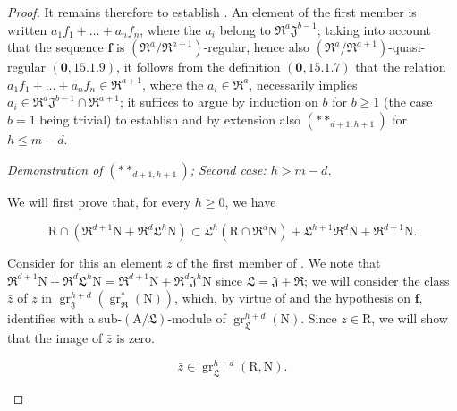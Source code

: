 \begin{proof}
It remains therefore to establish . An element of the first member is written $a_1f_1+\ldots+a_nf_n$, where the $a_i$ belong to $\mathfrak{R}^a\mathfrak{J}^{b-1}$; taking into account that the sequence $\mathbf{f}$ is $(\mathfrak{R}^a/\mathfrak{R}^{a+1})$-regular, hence also $(\mathfrak{R}^a/\mathfrak{R}^{a+1})$-quasi-regular $(\mathbf{0},15.1.9)$, it follows from the definition $(\mathbf{0},15.1.7)$ that the relation $a_1f_1+\ldots+a_nf_n\in\mathfrak{R}^{a+1}$, where the $a_i\in\mathfrak{R}^a$, necessarily implies $a_i\in\mathfrak{R}^a\mathfrak{J}^{b-1}\cap\mathfrak{R}^{a+1}$; it suffices to argue by
induction on $b$ for $b\geqslant 1$ (the case $b=1$ being trivial) to establish  and by extension also $(**_{d+1,h+1})$ for $h\leqslant m-d$.

\begin{env}[19.7.1.18]
\label{IV.19.7.1.18}
\emph{Demonstration of $(**_{d+1,h+1})$; Second case: $h>m-d$.}

We will first prove that, for every $h\geqslant 0$, we have
\end{env}
\begin{env}[19.7.1.19]
\label{IV.19.7.1.19}
\[
  \mathrm{R}\cap(\mathfrak{R}^{d+1}\mathrm{N}+\mathfrak{R}^d\mathfrak{L}^h\mathrm{N})\subset\mathfrak{L}^h(\mathrm{R}\cap\mathfrak{R}^d\mathrm{N})+\mathfrak{L}^{h+1}\mathfrak{R}^d\mathrm{N}+\mathfrak{R}^{d+1}\mathrm{N}.
\]
\end{env}

Consider for this an element $z$ of the first member of . We note that $\mathfrak{R}^{d+1}\mathrm{N}+\mathfrak{R}^d\mathfrak{L}^h\mathrm{N}=\mathfrak{R}^{d+1}\mathrm{N}+\mathfrak{R}^d\mathfrak{J}^h\mathrm{N}$ since $\mathfrak{L}=\mathfrak{J}+\mathfrak{R}$; we will consider the class $\bar{z}$ of $z$ in $\operatorname{gr}_\mathfrak{J}^{h+d}(\operatorname{gr}_\mathfrak{R}^*(\mathrm{N}))$, which, by virtue of  and the hypothesis on $\mathbf{f}$, identifies with a sub-$(\mathrm{A}/\mathfrak{L})$-module of $\operatorname{gr}_\mathfrak{L}^{h+d}(\mathrm{N})$. Since $z\in\mathrm{R}$, we will show that the image of $\bar{z}$ is zero.

\begin{env}[19.7.1.20]
\label{IV.19.7.1.20}
\[
  \bar{z}\in\operatorname{gr}_\mathfrak{L}^{h+d}(\mathrm{R},\mathrm{N}).
\]
\end{env}


\end{proof}
